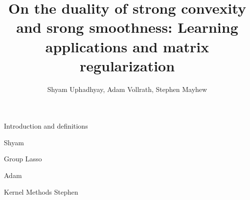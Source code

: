 \documentclass[11pt]{beamer}
\author{Shyam Uphadhyay, Adam Vollrath, Stephen Mayhew}
\title{On the duality of strong convexity and srong smoothness: Learning applications and matrix regularization}
\institute{UIUC}
\date{}
\begin{document}
{\nologo
\begin{frame}
\titlepage
\end{frame}
}


\begin{frame}{Introduction and definitions}

Shyam

\end{frame}

\begin{frame}{Group Lasso}

Adam

\end{frame}

\begin{frame}{Kernel Methods}
Stephen

\end{frame}
\end{document}
